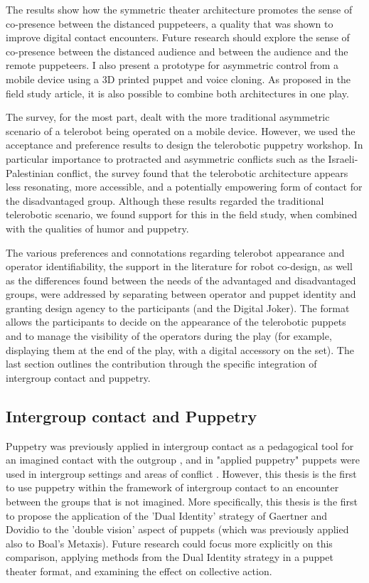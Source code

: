 \documentclass[dissertation,math,vertlayout,pdfa,colorlinks]{aaltoseries}
\begin{document}
The results show how the symmetric theater architecture promotes the sense of co-presence between the distanced puppeteers, a quality that was shown to improve digital contact encounters. Future research should explore the sense of co-presence between the distanced audience and between the audience and the remote puppeteers. I also present a prototype for asymmetric control from a mobile device using a 3D printed puppet and voice cloning. As proposed in the field study article, it is also possible to combine both architectures in one play.

The survey, for the most part, dealt with the more traditional asymmetric scenario of a telerobot being operated on a mobile device. However, we used the acceptance and preference results to design the telerobotic puppetry workshop. In particular importance to protracted and asymmetric conflicts such as the Israeli-Palestinian conflict, the survey found that the telerobotic architecture appears less resonating, more accessible, and a potentially empowering form of contact for the disadvantaged group. Although these results regarded the traditional telerobotic scenario, we found support for this in the field study, when combined with the qualities of humor and puppetry. 

The various preferences and connotations regarding telerobot appearance and operator identifiability, the support in the literature for robot co-design, as well as the differences found between the needs of the advantaged and disadvantaged groups, were addressed by separating between operator and puppet identity and granting design agency to the participants (and the Digital Joker). The format allows the participants to decide on the appearance of the telerobotic puppets and to manage the visibility of the operators during the play (for example, displaying them at the end of the play, with a digital accessory on the set). The last section outlines the contribution through the specific integration of intergroup contact and puppetry.

\subsection{Intergroup contact and Puppetry}
Puppetry was previously applied in intergroup contact as a pedagogical tool for an imagined contact with the outgroup \cite{charalampidouInventingNewRoad2022}, and in "applied puppetry" puppets were used in intergroup settings and areas of conflict \cite{grantObjectsObjectivesApplied2020}. However, this thesis is the first to use puppetry within the framework of intergroup contact to an encounter between the groups that is not imagined. More specifically, this thesis is the first to propose the application of the 'Dual Identity' strategy of Gaertner and Dovidio to the 'double vision' aspect of puppets (which was previously applied also to Boal's Metaxis). Future research could focus more explicitly on this comparison, applying methods from the Dual Identity strategy in a puppet theater format, and examining the effect on collective action.
\end{document}
